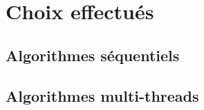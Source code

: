 \section {Choix effectués}

\subsection{Algorithmes séquentiels}

\subsection{Algorithmes multi-threads}
